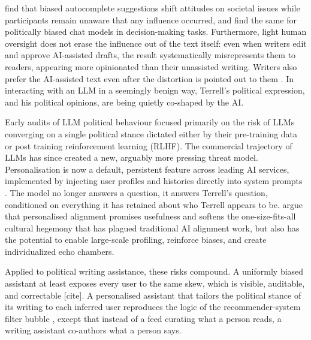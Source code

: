 \citet{williams-ceci_biased_2026} find that biased autocomplete suggestions shift attitudes on societal issues while participants remain unaware that any influence occurred, and \citet{fisher_biased_2025} find the same for politically biased chat models in decision-making tasks. Furthermore, light human oversight does not erase the influence out of the text itself: even when writers edit and approve AI-assisted drafts, the result systematically misrepresents them to readers, appearing more opinionated than their unassisted writing. Writers also prefer the AI-assisted text even after the distortion is pointed out to them \citep{rottger_measuring_2026}. In interacting with an LLM in a seemingly benign way, Terrell's political expression, and his political opinions, are being quietly co-shaped by the AI.

Early audits of LLM political behaviour focused primarily on the risk of LLMs converging on a single political stance dictated either by their pre-training data or post training reinforcement learning (RLHF). The commercial trajectory of LLMs has since created a new, arguably more pressing threat model. Personalisation is now a default, persistent feature across leading AI services, implemented by injecting user profiles and histories directly into system prompts \citep{openai2025power, anthropic2026claude,google2025gemini}. The model no longer answers a question, it answers Terrell's question, conditioned on everything it has retained about who Terrell appears to be. \citet{kirk_benefits_2024} argue that personalised alignment  promises usefulness and softens the one-size-fits-all cultural hegemony that has plagued traditional AI alignment work, but also has the potential to  enable large-scale profiling, reinforce biases, and create individualized echo chambers.

Applied to political writing assistance, these risks compound. A uniformly biased assistant at least exposes every user to the same skew, which is visible, auditable, and correctable [cite]. A personalised assistant that tailors the political stance of its writing to each inferred user reproduces the logic of the recommender-system filter bubble \citep{kirk_benefits_2024}, except that instead of a feed curating what a person reads, a writing assistant co-authors what a person says. 

